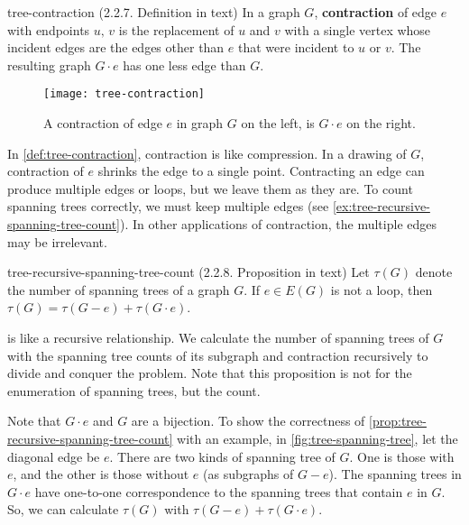 \documentclass[../src/handouts/main.tex]{subfiles}
\begin{document}
\begin{definition}{}{tree-contraction}
  (2.2.7. Definition in text)
  In a graph $G$, \textbf{contraction} of edge $e$ with endpoints $u,\, v$ is the replacement of $u$ and $v$ with a single vertex whose incident edges are the edges other than $e$ that were incident to $u$ or $v$. The resulting graph $G \cdot e$ has one less edge than $G$.
\end{definition}

\begin{figure}[htbp]
  \centering
  \texttt{[image: tree-contraction]}
  \caption{A contraction of edge $e$ in graph $G$ on the left, is $G \cdot e$ on the right.}
  \label{fig:tree-contraction}
\end{figure}

In \cref{def:tree-contraction}, contraction is like compression. In a drawing of $G$, contraction of $e$ shrinks the edge to a single point. Contracting an edge can produce multiple edges or loops, but we leave them as they are. To count spanning trees correctly, we must keep multiple edges (see \cref{ex:tree-recursive-spanning-tree-count}). In other applications of contraction, the multiple edges may be irrelevant.

\begin{proposition}{}{tree-recursive-spanning-tree-count}
  (2.2.8. Proposition in text)
  Let $\tau(G)$ denote the number of spanning trees of a graph $G$.
  If $e \in E(G)$ is not a loop, then $\tau (G) = \tau (G - e) + \tau (G \cdot e)$.
\end{proposition}

 is like a recursive relationship. We calculate the number of spanning trees of $G$ with the spanning tree counts of its subgraph and contraction recursively to divide and conquer the problem. Note that this proposition is not for the enumeration of spanning trees, but the count.

Note that $G \cdot e$ and $G$ are a bijection. To show the correctness of \cref{prop:tree-recursive-spanning-tree-count} with an example, in \cref{fig:tree-spanning-tree}, let the diagonal edge be $e$. There are two kinds of spanning tree of $G$. One is those with $e$, and the other is those without $e$ (as subgraphs of $G - e$). The spanning trees in $G \cdot e$ have one-to-one correspondence to the spanning trees that contain $e$ in $G$. So, we can calculate $\tau (G)$ with $\tau (G - e) + \tau (G \cdot e)$.
\end{document}
